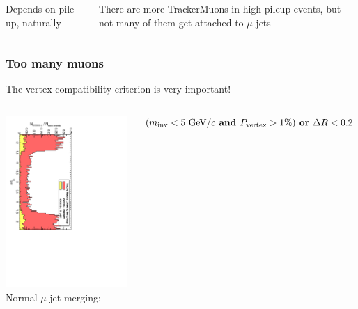 \documentclass[compress]{beamer}
\begin{document}
\begin{frame}
\begin{columns}
Depends on pile-up, naturally

\vspace{0.25 cm}
There are more TrackerMuons in high-pileup events, but not many of them get attached to $\mu$-jets
\end{columns}
\end{frame}

\begin{frame}
\frametitle{Too many muons}
The vertex compatibility criterion is very important!

\vfill
\begin{columns}
\includegraphics[height=\linewidth, angle=90]{toomanymuons_TrackerMuonsGroupByMassAndVertexProbOrDeltaR_pileup5.pdf}
Normal $\mu$-jet merging:

$(m_{\mbox{\scriptsize inv}} < 5\mbox{ GeV/}c \mbox{\bf\mbox{ and }} P_{\mbox{\scriptsize vertex}} > 1\%) \mbox{\bf\mbox{ or }} \Delta R < 0.2$
\end{columns}


\end{frame}
\end{document}
